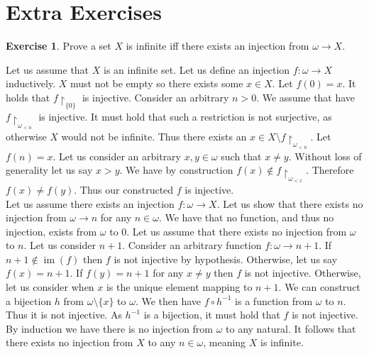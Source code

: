 \documentclass{article}
\theoremstyle{definition}
\newtheorem{exer}{Exercise}[section]
\DeclareMathOperator{\im}{im}
\newlength{\defparindent}
\newenvironment{answer}
    {\begin{mdframed}[backgroundcolor=gray!15, linewidth=0pt] \setlength{\parindent}{\defparindent}}
    {\end{mdframed}}
\begin{document}
\section{Extra Exercises}

\begin{exer}
    Prove a set $X$ is infinite iff there exists an injection from $\omega \to X$.

    \begin{answer}
        Let us assume that $X$ is an infinite set. Let us define an injection $f: \omega \to X$ inductively. $X$ must not be empty so there exists some $x \in X$. Let $f(0) = x$. It holds that $f\restriction_{\{0\}}$ is injective. Consider an arbitrary $n > 0$. We assume that have $f \restriction_{\omega_{< n}}$ is injective. It must hold that such a restriction is not surjective, as otherwise $X$ would not be infinite. Thus there exists an $x \in X \setminus f \restriction_{\omega_{< n}}$. Let $f(n) = x$. Let us consider an arbitrary $x, y \in \omega$ such that $x \ne y$. Without loss of generality let us say $x > y$. We have by construction $f(x) \not\in f\restriction_{\omega_{< x}}$. Therefore $f(x) \ne f(y)$. Thus our constructed $f$ is injective.
        \\[.1cm]
        Let us assume there exists an injection $f: \omega \to X$. Let us show that there exists no injection from $\omega \to n$ for any $n \in \omega$. We have that no function, and thus no injection, exists from $\omega$ to $0$. Let us assume that there exists no injection from $\omega$ to $n$. Let us consider $n + 1$. Consider an arbitrary function $f: \omega \to n + 1$. If $n + 1 \not\in \im(f)$ then $f$ is not injective by hypothesis. Otherwise, let us say $f(x) = n + 1$. If $f(y) = n + 1$  for any $x \ne y$ then $f$ is not injective. Otherwise, let us consider when $x$ is the unique element mapping to $n + 1$. We can construct a bijection $h$ from $\omega \setminus \{x\}$ to $\omega$. We then have $f \circ h^{-1}$ is a function from $\omega$ to $n$. Thus it is not injective. As $h^{-1}$ is a bijection, it must hold that $f$ is not injective. By induction we have there is no injection from $\omega$ to any natural. It follows that there exists no injection from $X$ to any $n \in \omega$, meaning $X$ is infinite. 
    \end{answer}
\end{exer}
\end{document}
